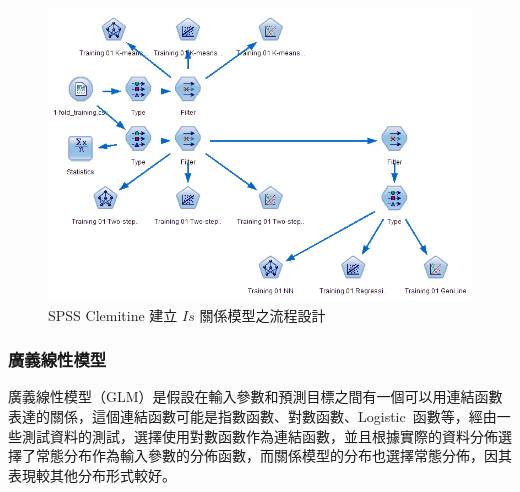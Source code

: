 \begin{figure}[hbtp]
  \begin{center}
    \includegraphics[width=1.0\textwidth]{figures/spss-mining.png}
    \caption{SPSS Clemitine 建立 $Is$ 關係模型之流程設計} 
    \label{fig:spss-mining}
  \end{center}
\end{figure}


\subsubsection{廣義線性模型}

廣義線性模型（GLM）是假設在輸入參數和預測目標之間有一個可以用連結函數表達的關係，這個連結函數可能是指數函數、對數函數、Logistic~函數等，經由一些測試資料的測試，選擇使用對數函數作為連結函數，並且根據實際的資料分佈選擇了常態分布作為輸入參數的分佈函數，而關係模型的分布也選擇常態分佈，因其表現較其他分布形式較好。


